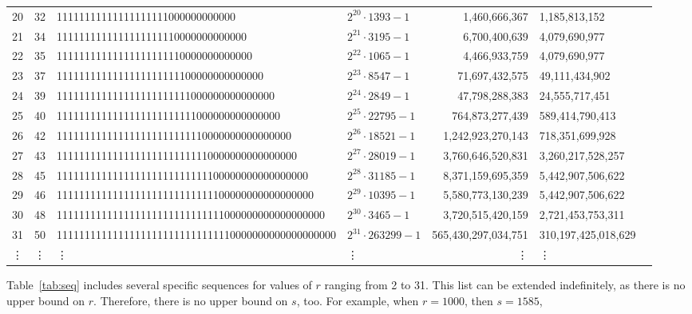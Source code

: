 \documentclass{amsart}
\theoremstyle{definition}
\theoremstyle{remark}
\numberwithin{equation}{section}
\begin{document}
\begin{table}[ht]
\begin{tabular}{p{}p{}p{}p{}rp{}p{}}
		20	&	32	&	11111111111111111111000000000000 & {$2^{20} \cdot 1393-1$} & 1,460,666,367 & 1,185,813,152\\
		21	&	34	&	1111111111111111111110000000000000 & {$2^{21} \cdot 3195-1$} & 6,700,400,639 & 4,079,690,977\\
		22	&	35	&	11111111111111111111110000000000000 & {$2^{22} \cdot 1065-1$} & 4,466,933,759 & 4,079,690,977\\
		23	&	37	&	1111111111111111111111100000000000000 & {$2^{23} \cdot 8547-1$} & 71,697,432,575 & 49,111,434,902\\
		24	&	39	&	111111111111111111111111000000000000000 & {$2^{24} \cdot 2849-1$} & 47,798,288,383 & 24,555,717,451\\
		25	&	40	&	1111111111111111111111111000000000000000 & {$2^{25} \cdot 22795-1$} & 764,873,277,439 & 589,414,790,413\\
		26	&	42	&	111111111111111111111111110000000000000000 & {$2^{26} \cdot 18521-1$} & 1,242,923,270,143 & 718,351,699,928\\
		27	&	43	&	1111111111111111111111111110000000000000000 & {$2^{27} \cdot 28019-1$} & 3,760,646,520,831 & 3,260,217,528,257\\
		28	&	45	&	111111111111111111111111111100000000000000000 & {$2^{28} \cdot 31185-1$} & 8,371,159,695,359 & 5,442,907,506,622\\
		29	&	46	&	1111111111111111111111111111100000000000000000 & {$2^{29} \cdot 10395-1$} & 5,580,773,130,239 & 5,442,907,506,622\\
		30	&	48	&	111111111111111111111111111111000000000000000000 & {$2^{30} \cdot 3465-1$} & 3,720,515,420,159 & 2,721,453,753,311\\
		31	&	50	&	11111111111111111111111111111110000000000000000000 & {$2^{31} \cdot 263299-1$} & 565,430,297,034,751 & 310,197,425,018,629\\	
		
		\vdots	&	\vdots	&	\vdots & \vdots &\vdots &	\vdots 	\\	
		
		\bottomrule

	\end{tabular}
\end{table}
\normalsize

Table~\ref{tab:seq} includes several specific sequences for values of $r$ ranging from 2 to 31. This list can be extended indefinitely, as there is no upper bound on $r$. Therefore, there is no upper bound on $s$, too. For example, when $r=1000$, then $s=1585$,\\
\end{document}
